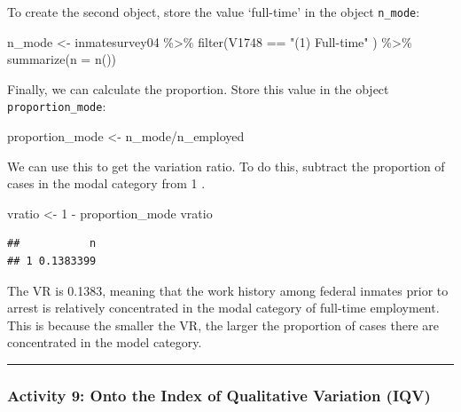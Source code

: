 \documentclass[
]{book}
\newenvironment{Shaded}{\begin{snugshade}}{\end{snugshade}}
\newcommand{\AttributeTok}[1]{\textcolor[rgb]{0.77,0.63,0.00}{#1}}
\newcommand{\DecValTok}[1]{\textcolor[rgb]{0.00,0.00,0.81}{#1}}
\newcommand{\FunctionTok}[1]{\textcolor[rgb]{0.00,0.00,0.00}{#1}}
\newcommand{\NormalTok}[1]{#1}
\newcommand{\OtherTok}[1]{\textcolor[rgb]{0.56,0.35,0.01}{#1}}
\newcommand{\SpecialCharTok}[1]{\textcolor[rgb]{0.00,0.00,0.00}{#1}}
\newcommand{\StringTok}[1]{\textcolor[rgb]{0.31,0.60,0.02}{#1}}
\begin{document}
To create the second object, store the value `full-time' in the object \texttt{n\_mode}:

\begin{Shaded}
\begin{Highlighting}[]
\NormalTok{n\_mode }\OtherTok{\textless{}{-}}\NormalTok{ inmatesurvey04 }\SpecialCharTok{\%\textgreater{}\%} 
  \FunctionTok{filter}\NormalTok{(V1748 }\SpecialCharTok{==} \StringTok{"(1) Full{-}time"}\NormalTok{ ) }\SpecialCharTok{\%\textgreater{}\%} 
  \FunctionTok{summarize}\NormalTok{(}\AttributeTok{n =} \FunctionTok{n}\NormalTok{()) }
\end{Highlighting}
\end{Shaded}

Finally, we can calculate the proportion. Store this value in the object \texttt{proportion\_mode}:

\begin{Shaded}
\begin{Highlighting}[]
\NormalTok{proportion\_mode }\OtherTok{\textless{}{-}}\NormalTok{ n\_mode}\SpecialCharTok{/}\NormalTok{n\_employed }
\end{Highlighting}
\end{Shaded}

We can use this to get the variation ratio. To do this, subtract the proportion of cases in the modal category from 1 .

\begin{Shaded}
\begin{Highlighting}[]
\NormalTok{vratio }\OtherTok{\textless{}{-}} \DecValTok{1} \SpecialCharTok{{-}}\NormalTok{ proportion\_mode}
\NormalTok{vratio}
\end{Highlighting}
\end{Shaded}

\begin{verbatim}
##           n
## 1 0.1383399
\end{verbatim}

The VR is 0.1383, meaning that the work history among federal inmates prior to arrest is relatively concentrated in the modal category of full-time employment. This is because the smaller the VR, the larger the proportion of cases there are concentrated in the model category.

\begin{center}\rule{0.5\linewidth}{0.5pt}\end{center}

\hypertarget{activity-9-onto-the-index-of-qualitative-variation-iqv}{%
\subsubsection{Activity 9: Onto the Index of Qualitative Variation (IQV)}\label{activity-9-onto-the-index-of-qualitative-variation-iqv}}
\end{document}
